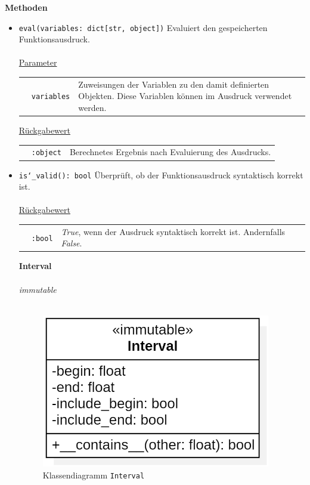 \documentclass{article}
\begin{document}
\textbf{{Methoden}}
\begin{itemize}
\item \texttt{eval(variables: dict[str, object])} \newline Evaluiert den gespeicherten Funktionsausdruck.
\\\\
\underline{{Parameter}}

\begin{tabular}{lll}
 & \texttt{variables} & Zuweisungen der Variablen zu den damit definierten Objekten. Diese Variablen können im Ausdruck verwendet werden. \\
\end{tabular}

\underline{{Rückgabewert}}

\begin{tabular}{lll}
 & \texttt{:object} & Berechnetes Ergebnis nach Evaluierung des Ausdrucks. \\
\end{tabular}

\item \texttt{is\char`_valid(): bool} \newline Überprüft, ob der Funktionsausdruck syntaktisch korrekt ist.
\\\\
\underline{{Rückgabewert}}

\begin{tabular}{lll}
 & \texttt{:bool} & \textit{True}, wenn der Ausdruck syntaktisch korrekt ist. Andernfalls \textit{False}. \\
\end{tabular}




\newpage
\textbf{\large{Interval}}\\\\
\textit{\flqq{}immutable\frqq}\normalsize\\\\
\begin{figure}[H]%
    \centering
    \includegraphics[width=10cm]{entwurf/Entwurf_dokument/img/cls/model/Interval.png}
    \caption{Klassendiagramm \texttt{Interval}}
\end{figure}


\end{itemize}
\end{document}
